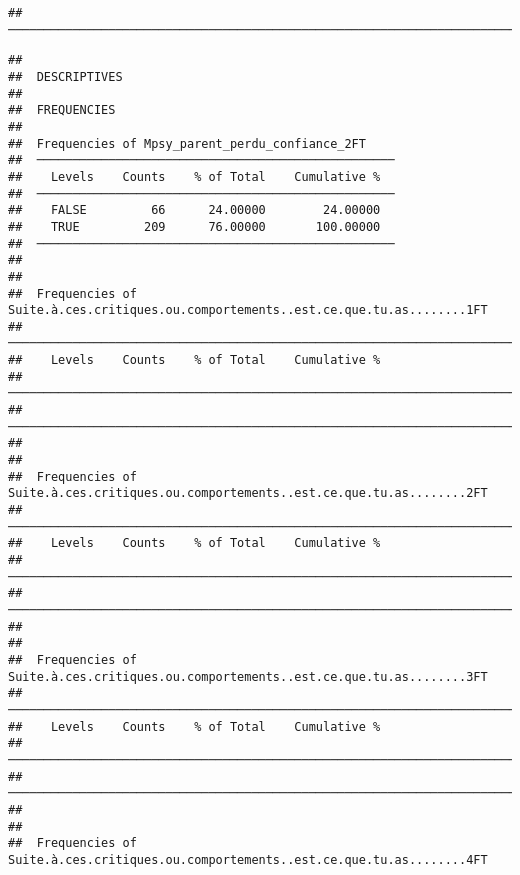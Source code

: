 \documentclass[
]{article}
\begin{document}
\begin{verbatim}
##  ─────────────────────────────────────────────────────────────────────────────────────────────────────────────────────────────────────────────────────────────────────────────────────────────────────────────────────────────────────────────────────────────────────────────────────────────────────────────────────────────────────────────────────────────────────────────────────────────────────────────────────────────────────────────────────────────────────────────────────────────────────────────────────────────────────────────────────────────────────────────────────────────────────────────────────────────────────────────────────────────────────────────────────────
\end{verbatim}

\begin{verbatim}
## 
##  DESCRIPTIVES
## 
##  FREQUENCIES
## 
##  Frequencies of Mpsy_parent_perdu_confiance_2FT     
##  ────────────────────────────────────────────────── 
##    Levels    Counts    % of Total    Cumulative %   
##  ────────────────────────────────────────────────── 
##    FALSE         66      24.00000        24.00000   
##    TRUE         209      76.00000       100.00000   
##  ────────────────────────────────────────────────── 
## 
## 
##  Frequencies of Suite.à.ces.critiques.ou.comportements..est.ce.que.tu.as........1FT 
##  ────────────────────────────────────────────────────────────────────────────────── 
##    Levels    Counts    % of Total    Cumulative %   
##  ────────────────────────────────────────────────────────────────────────────────── 
##  ────────────────────────────────────────────────────────────────────────────────── 
## 
## 
##  Frequencies of Suite.à.ces.critiques.ou.comportements..est.ce.que.tu.as........2FT 
##  ────────────────────────────────────────────────────────────────────────────────── 
##    Levels    Counts    % of Total    Cumulative %   
##  ────────────────────────────────────────────────────────────────────────────────── 
##  ────────────────────────────────────────────────────────────────────────────────── 
## 
## 
##  Frequencies of Suite.à.ces.critiques.ou.comportements..est.ce.que.tu.as........3FT 
##  ────────────────────────────────────────────────────────────────────────────────── 
##    Levels    Counts    % of Total    Cumulative %   
##  ────────────────────────────────────────────────────────────────────────────────── 
##  ────────────────────────────────────────────────────────────────────────────────── 
## 
## 
##  Frequencies of Suite.à.ces.critiques.ou.comportements..est.ce.que.tu.as........4FT 

\end{verbatim}
\end{document}
